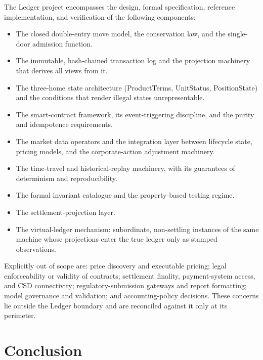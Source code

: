 \documentclass[11pt,a4paper]{article}
\newcommand{\clabel}[1]{\leavevmode\hypertarget{clause-#1}{}%
  \marginpar{\raggedright\scriptsize\ttfamily\textcolor{gray}{#1}}}
\providecommand{\tightlist}{\setlength{\itemsep}{2pt}\setlength{\parskip}{0pt}}
\begin{document}
\clabel{C-Scope.1}The Ledger project encompasses the design, formal specification,
reference implementation, and verification of the following components:

\begin{itemize}
\tightlist
\item
  \clabel{C-Scope.2}The closed double-entry move model, the conservation law, and the
  single-door admission function.
\item
  \clabel{C-Scope.3}The immutable, hash-chained transaction log and the projection
  machinery that derives all views from it.
\item
  \clabel{C-Scope.4}The three-home state architecture (ProductTerms, UnitStatus,
  PositionState) and the conditions that render illegal states
  unrepresentable.
\item
  \clabel{C-Scope.5}The smart-contract framework, its event-triggering discipline, and the
  purity and idempotence requirements.
\item
  \clabel{C-Scope.6}The market data operators and the integration layer between lifecycle
  state, pricing models, and the corporate-action adjustment machinery.
\item
  \clabel{C-Scope.7}The time-travel and historical-replay machinery, with its guarantees
  of determinism and reproducibility.
\item
  \clabel{C-Scope.8}The formal invariant catalogue and the property-based testing regime.
\item
  \clabel{C-Scope.9}The settlement-projection layer.
\item
  \clabel{C-Scope.10}The virtual-ledger mechanism: subordinate, non-settling instances of
  the same machine whose projections enter the true ledger only as
  stamped observations.
\end{itemize}

\clabel{C-Scope.11}Explicitly out of scope are: price discovery and executable pricing;
legal enforceability or validity of contracts; settlement finality,
payment-system access, and CSD connectivity; regulatory-submission
gateways and report formatting; model governance and validation; and
accounting-policy decisions. These concerns lie outside the Ledger
boundary and are reconciled against it only at its perimeter.

\hypertarget{conclusion}{%
\section{Conclusion}\label{conclusion}}
\end{document}
